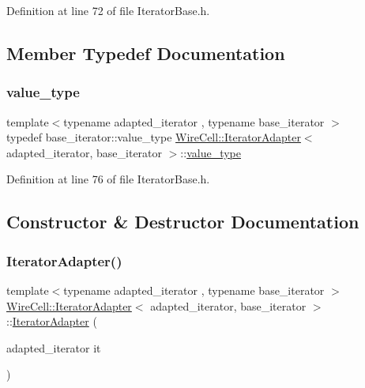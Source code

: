 Definition at line 72 of file Iterator\+Base.\+h.



\subsection{Member Typedef Documentation}
\mbox{\label{class_wire_cell_1_1_iterator_adapter_a8f7594d66b0d00566f61976bcf4ab13e}} 
\subsubsection{\texorpdfstring{value\+\_\+type}{value\_type}}
{\footnotesize\ttfamily template$<$typename adapted\+\_\+iterator , typename base\+\_\+iterator $>$ \\
typedef base\+\_\+iterator\+::value\+\_\+type \hyperlink{class_wire_cell_1_1_iterator_adapter}{Wire\+Cell\+::\+Iterator\+Adapter}$<$ adapted\+\_\+iterator, base\+\_\+iterator $>$\+::\hyperlink{class_wire_cell_1_1_iterator_adapter_a8f7594d66b0d00566f61976bcf4ab13e}{value\+\_\+type}}



Definition at line 76 of file Iterator\+Base.\+h.



\subsection{Constructor \& Destructor Documentation}
\mbox{\label{class_wire_cell_1_1_iterator_adapter_af12e12abf4b3fb3745d53283313da519}} 
\subsubsection{\texorpdfstring{Iterator\+Adapter()}{IteratorAdapter()}}
{\footnotesize\ttfamily template$<$typename adapted\+\_\+iterator , typename base\+\_\+iterator $>$ \\
\hyperlink{class_wire_cell_1_1_iterator_adapter}{Wire\+Cell\+::\+Iterator\+Adapter}$<$ adapted\+\_\+iterator, base\+\_\+iterator $>$\+::\hyperlink{class_wire_cell_1_1_iterator_adapter}{Iterator\+Adapter} (\begin{DoxyParamCaption}\item[{adapted\+\_\+iterator}]{it }\end{DoxyParamCaption})\hspace{0.3cm}{\ttfamily [inline]}}



